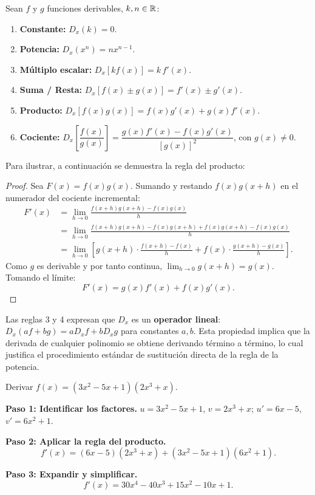 \begin{theorem}
Sean $f$ y $g$ funciones derivables, $k,n\in{\mathbb R}$:
\begin{enumerate}
    \item \textbf{Constante:} $D_x(k) = 0$.
    \item \textbf{Potencia:} $D_x(x^n) = nx^{n-1}$.
    \item \textbf{Múltiplo escalar:} $D_x[kf(x)] = k\,f'(x)$.
    \item \textbf{Suma / Resta:} $D_x[f(x)\pm g(x)] = f'(x)\pm g'(x)$.
    \item \textbf{Producto:} $D_x[f(x)g(x)] = f(x)g'(x)+g(x)f'(x)$.
    \item \textbf{Cociente:} $D_x\!\left[\dfrac{f(x)}{g(x)}\right]
    = \dfrac{g(x)f'(x)-f(x)g'(x)}{[g(x)]^2}$, \; con $g(x)\neq 0$.
\end{enumerate}
\end{theorem}
Para ilustrar, a continuación se demuestra la regla del producto:
\begin{proof}
Sea $F(x) = f(x)g(x)$. Sumando y restando $f(x)g(x+h)$ en el numerador del cociente incremental:
\begin{align*}
F'(x) &= \lim_{h\to 0}\frac{f(x+h)g(x+h)-f(x)g(x)}{h} \\
&= \lim_{h\to 0}\frac{f(x+h)g(x+h)-f(x)g(x+h)+f(x)g(x+h)-f(x)g(x)}{h}\\
&= \lim_{h\to 0}\left[g(x+h)\cdot\frac{f(x+h)-f(x)}{h}
   + f(x)\cdot\frac{g(x+h)-g(x)}{h}\right].
\end{align*}
Como $g$ es derivable y por tanto continua, $\lim_{h\to 0}g(x+h)=g(x)$.
Tomando el límite:
\[
F'(x) = g(x)f'(x) + f(x)g'(x).
\]
\end{proof}

\begin{rem}
Las reglas 3 y 4 expresan que $D_x$ es un \textbf{operador lineal}: $D_x(af+bg) = aD_x f + bD_x g$ para constantes $a,b$. Esta propiedad implica que la derivada de cualquier polinomio se obtiene
derivando término a término, lo cual justifica el procedimiento estándar de sustitución directa de la regla de la potencia.
\end{rem}

\begin{example}
Derivar $f(x) = (3x^2-5x+1)(2x^3+x)$.

\begin{myproof}

\textbf{Paso 1: Identificar los factores.}
$u=3x^2-5x+1$, $v=2x^3+x$; $u'=6x-5$, $v'=6x^2+1$.

\textbf{Paso 2: Aplicar la regla del producto.}
\[
f'(x) = (6x-5)(2x^3+x)+(3x^2-5x+1)(6x^2+1).
\]

\textbf{Paso 3: Expandir y simplificar.}
\[
\boxed{f'(x) = 30x^4-40x^3+15x^2-10x+1.}
\]
\end{myproof}
\end{example}

